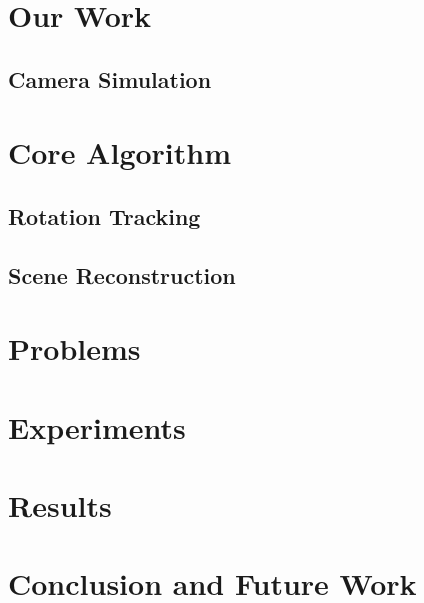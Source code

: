 \documentclass[10pt,twocolumn,letterpaper]{article}
\begin{document}
\section{Our Work}
\label{sec:our_work}


\subsection{Camera Simulation}
\label{sec:simulation}



\section{Core Algorithm}
\label{sec:core_algorithm}


\subsection{Rotation Tracking}
\label{sec:tracking}


\subsection{Scene Reconstruction}
\label{sec:scene_reconstruction}



\section{Problems}
\label{sec:problems}



\section{Experiments}
\label{sec:experiments}



\section{Results}
\label{sec:results}


\section{Conclusion and Future Work}

\label{sec:conclusion}

{\small


}
\end{document}
